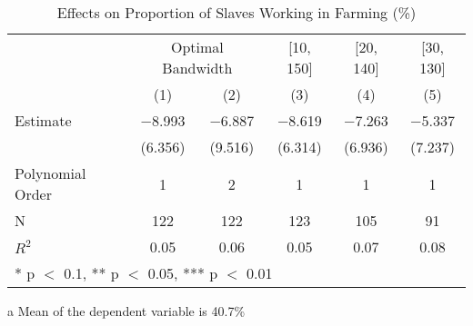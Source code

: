 \begin{table}[!h]

\caption{Effects on Proportion of Slaves Working in Farming (\%) \label{tab:rdd_enslaved_farming}}
\centering
\begin{threeparttable}
\begin{tabular}[t]{lccccc}
\toprule
\multicolumn{1}{c}{} & \multicolumn{2}{c}{Optimal Bandwidth} & \multicolumn{1}{c}{[10, 150]} & \multicolumn{1}{c}{[20, 140]} & \multicolumn{1}{c}{[30, 130]} \\
\cmidrule(l{3pt}r{3pt}){2-3} \cmidrule(l{3pt}r{3pt}){4-4} \cmidrule(l{3pt}r{3pt}){5-5} \cmidrule(l{3pt}r{3pt}){6-6}
  & (1) & (2) & (3) & (4) & (5)\\
\midrule
Estimate & \num{-8.993} & \num{-6.887} & \num{-8.619} & \num{-7.263} & \num{-5.337}\\
 & (\num{6.356}) & (\num{9.516}) & (\num{6.314}) & (\num{6.936}) & (\num{7.237})\\

\midrule
Polynomial Order & 1 & 2 & 1 & 1 & 1\\
N & \num{122} & \num{122} & \num{123} & \num{105} & \num{91}\\
$R^2$ & \num{0.05} & \num{0.06} & \num{0.05} & \num{0.07} & \num{0.08}\\
\bottomrule
\multicolumn{6}{l}{\rule{0pt}{1em}* p $<$ 0.1, ** p $<$ 0.05, *** p $<$ 0.01}\\
\end{tabular}
\begin{tablenotes}
\item[a] Mean of the dependent variable is 40.7\%
\end{tablenotes}
\end{threeparttable}
\end{table}

